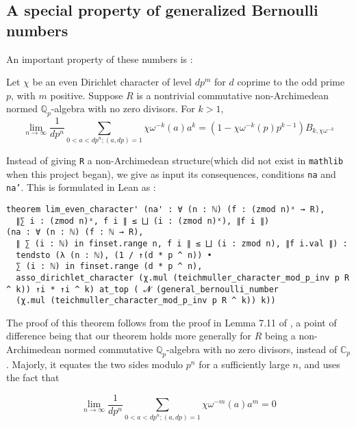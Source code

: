 \documentclass[a4paper,UKenglish,cleveref, autoref, thm-restate,pdfa]{lipics-v2021}
\newcommand{\lean}[1]{\texttt{#1}\xspace} %
\begin{document}
\subsection{A special property of generalized Bernoulli numbers}
An important property of these numbers is : 
\begin{theorem}\label{thm1}
Let $\chi$ be an even Dirichlet character of level $dp^m$ for $d$ coprime to the odd prime $p$, with $m$ positive. 
Suppose $R$ is a nontrivial commutative non-Archimedean normed $\mathbb{Q}_p$-algebra with no zero divisors. 
For $k > 1$, 
$$ \lim_{n \to \infty} \frac{1}{dp^{n}} \sum_{0 < a < dp^{n} ; (a, dp) = 1} \chi \omega^{-k} (a) a^{k} = 
(1 - \chi \omega^{-k} (p) p^{k-1}) B_{k, \chi \omega^{-k}} $$
\end{theorem} 
Instead of giving \lean{R} a non-Archimedean structure(which did not exist in \lean{mathlib} when this project began), 
we give as input its consequences, conditions \lean{na} and \lean{na'}. This is formulated in Lean as :
\begin{lstlisting}
theorem lim_even_character' (na' : ∀ (n : ℕ) (f : (zmod n)ˣ → R), 
  ∥∑ i : (zmod n)ˣ, f i ∥ ≤ ⨆ (i : (zmod n)ˣ), ∥f i ∥)
(na : ∀ (n : ℕ) (f : ℕ → R), 
  ∥ ∑ (i : ℕ) in finset.range n, f i ∥ ≤ ⨆ (i : zmod n), ∥f i.val ∥) : 
  tendsto (λ (n : ℕ), (1 / ↑(d * p ^ n)) • 
  ∑ (i : ℕ) in finset.range (d * p ^ n),
  asso_dirichlet_character (χ.mul (teichmuller_character_mod_p_inv p R ^ k)) ↑i * ↑i ^ k) at_top ( 𝓝 (general_bernoulli_number 
  (χ.mul (teichmuller_character_mod_p_inv p R ^ k)) k))
\end{lstlisting}
The proof of this theorem follows from the proof in Lemma 7.11 of \cite{cyc}, a 
point of difference being that our theorem holds more generally for $R$ being a non-Archimedean normed commutative $\mathbb{Q}_p$-algebra with no zero divisors, 
instead of $\mathbb{C}_p$. Majorly, it equates the two sides modulo $p^n$ for a 
sufficiently large $n$, and uses the fact that 
\begin{theorem}\label{thm2}
  $$ \lim_{n \to \infty} \frac{1}{dp^{n}} \sum_{0 < a < dp^{n} ; (a, dp) = 1} \chi \omega^{-m} (a) a^{m} = 0 $$
\end{theorem}
\end{document}
